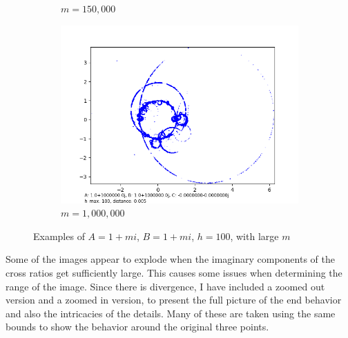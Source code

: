 \documentclass[12pt,a4paper,reqno,parskip=full]{amsart}
\numberwithin{equation}{section}
\theoremstyle{plain}
\theoremstyle{definition}
\begin{document}
\begin{figure}
\begin{subfigure}[b]{0.3\textwidth}
         \caption{$m=150,000$}
         \label{fig:m150,000}
     \end{subfigure}
     \hfill 
     \begin{subfigure}[b]{0.3\textwidth}
         \centering
         \includegraphics[width=\textwidth]{images/m/a1,000,000,b1,000,000,h100,d.005.png}
         \caption{$m=1,000,000$}
         \label{fig:m1,000,000}
     \end{subfigure}
        \caption{Examples of $A=1+mi$, $B=1+mi$, $h=100$, with large $m$}
        \label{fig:large-m}
\end{figure}

Some of the images appear to explode when the imaginary components of the cross ratios get sufficiently large. This causes some issues when determining the range of the image. Since there is divergence, I have included a zoomed out version and a zoomed in version, to present the full picture of the end behavior and also the intricacies of the details. Many of these are taken using the same bounds to show the behavior around the original three points.
\end{document}
